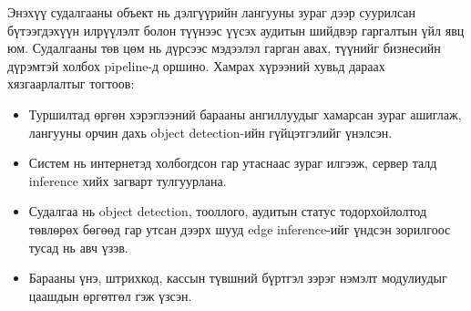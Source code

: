 Энэхүү судалгааны объект нь дэлгүүрийн лангууны зураг дээр суурилсан бүтээгдэхүүн илрүүлэлт болон түүнээс үүсэх аудитын шийдвэр гаргалтын үйл явц юм. Судалгааны төв цөм нь дүрсээс мэдээлэл гарган авах, түүнийг бизнесийн дүрэмтэй холбох pipeline-д оршино. Хамрах хүрээний хувьд дараах хязгаарлалтыг тогтоов:

\begin{itemize}
    \item Туршилтад өргөн хэрэглээний барааны ангиллуудыг хамарсан зураг ашиглаж, лангууны орчин дахь object detection-ийн гүйцэтгэлийг үнэлсэн.
    \item Систем нь интернетэд холбогдсон гар утаснаас зураг илгээж, сервер талд inference хийх загварт тулгуурлана.
    \item Судалгаа нь object detection, тооллого, аудитын статус тодорхойлолтод төвлөрөх бөгөөд гар утсан дээрх шууд edge inference-ийг үндсэн зорилгоос тусад нь авч үзэв.
    \item Барааны үнэ, штрихкод, кассын түвшний бүртгэл зэрэг нэмэлт модулиудыг цаашдын өргөтгөл гэж үзсэн.
\end{itemize}





